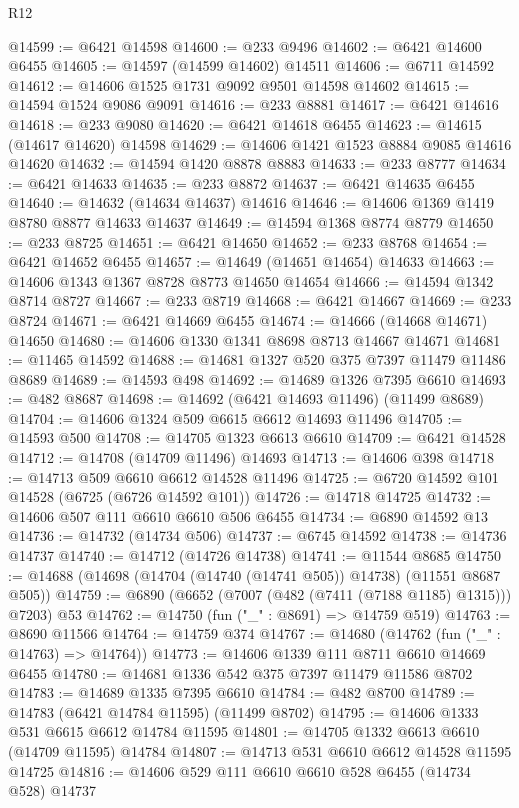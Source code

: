 \begin{lexlean}{R12}
\begin{coremodule}
{{{{{{{{{{{{{{{{{{{{{{{{{{{{{{{{{{{{{{{{{{{{{{{{{{{{{{{{{{{{{{{{{{{{{{{{{{{{{{{{{{@14599 := @6421 @14598
@14600 := @233 @9496
@14602 := @6421 @14600 @6455
@14605 := @14597 (@14599 @14602) @14511
@14606 := @6711 @14592
@14612 := @14606 @1525 @1731 @9092 @9501 @14598 @14602
@14615 := @14594 @1524 @9086 @9091
@14616 := @233 @8881
@14617 := @6421 @14616
@14618 := @233 @9080
@14620 := @6421 @14618 @6455
@14623 := @14615 (@14617 @14620) @14598
@14629 := @14606 @1421 @1523 @8884 @9085 @14616 @14620
@14632 := @14594 @1420 @8878 @8883
@14633 := @233 @8777
@14634 := @6421 @14633
@14635 := @233 @8872
@14637 := @6421 @14635 @6455
@14640 := @14632 (@14634 @14637) @14616
@14646 := @14606 @1369 @1419 @8780 @8877 @14633 @14637
@14649 := @14594 @1368 @8774 @8779
@14650 := @233 @8725
@14651 := @6421 @14650
@14652 := @233 @8768
@14654 := @6421 @14652 @6455
@14657 := @14649 (@14651 @14654) @14633
@14663 := @14606 @1343 @1367 @8728 @8773 @14650 @14654
@14666 := @14594 @1342 @8714 @8727
@14667 := @233 @8719
@14668 := @6421 @14667
@14669 := @233 @8724
@14671 := @6421 @14669 @6455
@14674 := @14666 (@14668 @14671) @14650
@14680 := @14606 @1330 @1341 @8698 @8713 @14667 @14671
@14681 := @11465 @14592
@14688 := @14681 @1327 @520 @375 @7397 @11479 @11486 @8689
@14689 := @14593 @498
@14692 := @14689 @1326 @7395 @6610
@14693 := @482 @8687
@14698 := @14692 (@6421 @14693 @11496) (@11499 @8689)
@14704 := @14606 @1324 @509 @6615 @6612 @14693 @11496
@14705 := @14593 @500
@14708 := @14705 @1323 @6613 @6610
@14709 := @6421 @14528
@14712 := @14708 (@14709 @11496) @14693
@14713 := @14606 @398
@14718 := @14713 @509 @6610 @6612 @14528 @11496
@14725 := @6720 @14592 @101 @14528 (@6725 (@6726 @14592 @101))
@14726 := @14718 @14725
@14732 := @14606 @507 @111 @6610 @6610 @506 @6455
@14734 := @6890 @14592 @13
@14736 := @14732 (@14734 @506)
@14737 := @6745 @14592
@14738 := @14736 @14737
@14740 := @14712 (@14726 @14738)
@14741 := @11544 @8685
@14750 := @14688 (@14698 (@14704 (@14740 (@14741 @505)) @14738) (@11551 @8687 @505))
@14759 := @6890 (@6652 (@7007 (@482 (@7411 (@7188 @1185) @1315))) @7203) @53
@14762 := @14750 (fun ("_" : @8691) => @14759 @519)
@14763 := @8690 @11566
@14764 := @14759 @374
@14767 := @14680 (@14762 (fun ("_" : @14763) => @14764))
@14773 := @14606 @1339 @111 @8711 @6610 @14669 @6455
@14780 := @14681 @1336 @542 @375 @7397 @11479 @11586 @8702
@14783 := @14689 @1335 @7395 @6610
@14784 := @482 @8700
@14789 := @14783 (@6421 @14784 @11595) (@11499 @8702)
@14795 := @14606 @1333 @531 @6615 @6612 @14784 @11595
@14801 := @14705 @1332 @6613 @6610 (@14709 @11595) @14784
@14807 := @14713 @531 @6610 @6612 @14528 @11595 @14725
@14816 := @14606 @529 @111 @6610 @6610 @528 @6455 (@14734 @528) @14737
}}}}}}}}}}}}}}}}}}}}}}}}}}}}}}}}}}}}}}}}}}}}}}}}}}}}}}}}}}}}}}}}}}}}}}}}}}}}}}}}}}
\end{coremodule}
\end{lexlean}
